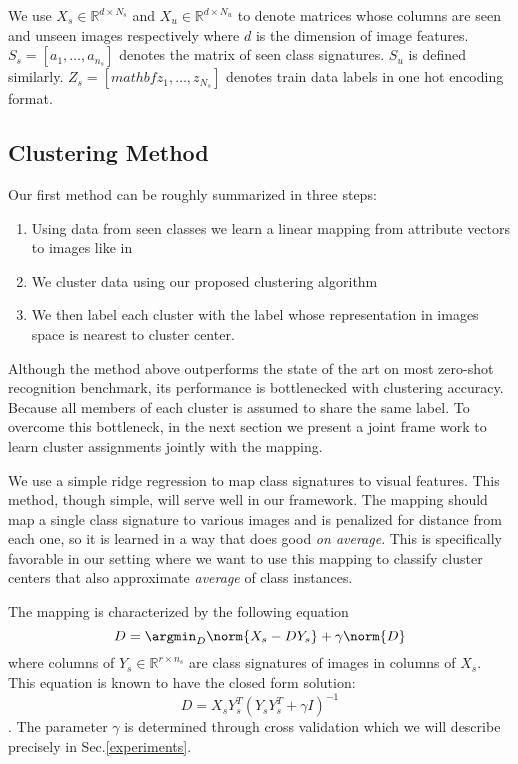 We use $X_s \in \mathbb{R}^{d \times N_s}$ and $X_u \in \mathbb{R}^{d \times N_u}$
to denote matrices whose columns are seen and unseen images respectively where $d$ is the dimension of image features.
$S_s = [a_1, \ldots, a_{n_s}]$ denotes the matrix of seen class signatures. $S_u$ is defined similarly.
$Z_s = [ mathbf{z_1, \ldots, z_{N_s}} ]$
denotes train data labels in one hot encoding format.

\subsection{Clustering Method}
Our first method can be roughly summarized in three steps:
\begin{enumerate}
  \item Using data from seen classes we learn a linear mapping from  attribute vectors to images like in \cite{Kodirov2015}
  \item We cluster data using our proposed clustering algorithm
  \item We then label each cluster with the label whose representation in images space is nearest to cluster center.
\end{enumerate}
 Although the method above outperforms the state of the art on most zero-shot recognition benchmark,
its performance is bottlenecked with clustering accuracy. Because all members of each cluster is assumed to
share the same label. To overcome this bottleneck, in the next section we
present a joint frame work to learn cluster assignments jointly with the mapping.

We use a simple ridge regression to map class signatures to visual features. This method, though simple,
will serve well in our framework. The mapping should map a single class signature to various images and is penalized
for distance from each one, so it is learned in a way that does good \textit{on average}. This is specifically
favorable in our setting where we want to use this mapping to classify cluster centers that also
approximate \textit{average} of class instances.

The mapping is characterized by the following equation
\begin{equation}
  D = \argmin_D \norm{X_s - D Y_s} + \gamma \norm{D}
\end{equation}
where columns of $ Y_s \in \mathbb{R}^{r \times n_s} $  are class signatures of images in columns of $X_s$.
This equation is known to have the closed form solution:
\begin{equation} \label{eq:dic}
  D = X_s Y_s^T (Y_s Y_s^T + \gamma I)^{-1}
\end{equation}.
The parameter $\gamma$ is determined through cross validation which we will describe precisely in Sec.\ref{experiments}.

